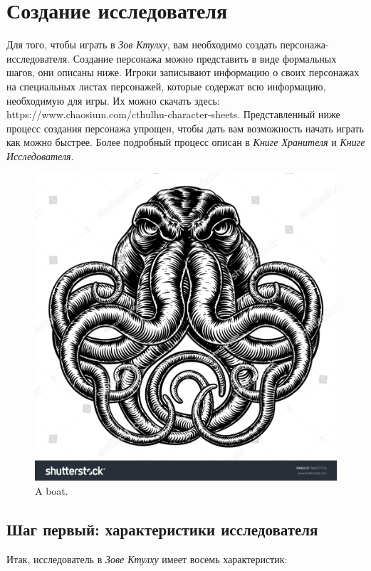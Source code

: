 \documentclass[letterpaper,twocolumn,openany, twoside, 11pt, usenames]{cocbook}
\begin{document}
\section*{\nohyphens{Создание исследователя}}

Для того, чтобы играть в {\it Зов Ктулху}, вам необходимо создать персонажа-исследователя. Создание персонажа можно представить в виде формальных шагов, они описаны ниже. Игроки записывают информацию о своих персонажах на специальных листах персонажей, которые содержат всю информацию, необходимую для игры. Их можно скачать здесь: https://www.chaosium.com/cthulhu-character-sheets.
Представленный ниже процесс создания персонажа упрощен, чтобы дать вам возможность начать играть как можно быстрее. Более подробный процесс описан в {\it Книге Хранителя} и {\it Книге Исследователя}.

\begin{figure}
  \includegraphics[width=\linewidth]{img/cthulhu.jpg}
  \caption{A boat.}
  \label{fig:boat1}
\end{figure}

\begin{figure}
\setthemecolor[CoCPaperBox]
\end{figure}

\subsection*{Шаг первый: характеристики исследователя}
Итак, исследователь в {\it Зове Ктулху} имеет восемь характеристик:
\end{document}
